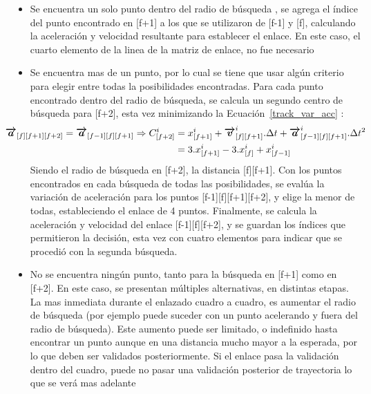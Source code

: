 \begin{itemize}
\item Se encuentra un solo punto dentro del radio de búsqueda , se agrega el índice del punto encontrado en [f+1] a los que se utilizaron de [f-1] y [f], calculando la aceleración y velocidad resultante para establecer el enlace. En este caso, el cuarto elemento de la linea de la matriz de enlace, no fue necesario 
\item Se encuentra mas de un punto, por lo cual se tiene que usar algún criterio para elegir entre todas la posibilidades encontradas. Para cada punto encontrado dentro del radio de búsqueda, se calcula un segundo centro de búsqueda para [f+2], esta vez minimizando la Ecuación~\ref{track_var_acc} :
\begin{equation}
\hspace{-1cm}
\begin{split}
\boldsymbol{\overrightarrow{a}}_{[f][f+1][f+2]}=\boldsymbol{\overrightarrow{a}}_{[f-1][f][f+1]} \Rightarrow C_{[f+2]}^{i} &= x_{[f+1]}^{i} + \boldsymbol{\overrightarrow{v}}_{[f][f+1]}^{i}.\Delta{t} + \boldsymbol{\overrightarrow{a}}_{[f-1][f][f+1]}^{i}.\Delta{t}^2\\
&= 3.x_{[f+1]}^{i} - 3.x_{[f]}^{i} + x_{[f-1]}^{i}\end{split}
\label{centro_busqueda_f2}
\end{equation}
Siendo el radio de búsqueda en [f+2], la distancia [f][f+1]. Con los puntos encontrados en cada búsqueda de todas las posibilidades, se evalúa la variación de aceleración para los puntos [f-1][f][f+1][f+2], y elige la menor de todas, estableciendo el enlace de 4 puntos. Finalmente, se calcula la aceleración y velocidad del enlace [f-1][f][f+2], y se guardan los índices que permitieron la decisión, esta vez con cuatro elementos para indicar que se procedió con la segunda búsqueda.
\item No se encuentra ningún punto, tanto para la búsqueda en [f+1] como en [f+2]. En este caso, se presentan múltiples alternativas, en distintas etapas. La mas inmediata durante el enlazado cuadro a cuadro, es aumentar el radio de búsqueda (por ejemplo puede suceder con un punto acelerando y fuera del radio de búsqueda). Este aumento puede ser limitado, o indefinido hasta encontrar un punto aunque en una distancia mucho mayor a la esperada, por lo que deben ser validados posteriormente. Si el enlace pasa la validación dentro del cuadro, puede no pasar una validación posterior de trayectoria lo que se verá mas adelante
\end{itemize}

